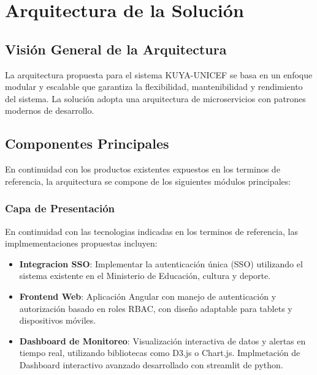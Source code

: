 \section{Arquitectura de la Solución}

\subsection{Visión General de la Arquitectura}

La arquitectura propuesta para el sistema KUYA-UNICEF se basa en un enfoque modular y escalable que garantiza la flexibilidad, mantenibilidad y rendimiento del sistema. La solución adopta una arquitectura de microservicios con patrones modernos de desarrollo.

\subsection{Componentes Principales}
En continuidad con los productos existentes expuestos en los terminos de referencia, la arquitectura se compone de los siguientes módulos principales:

\subsubsection{Capa de Presentación}
En continuidad con las tecnologias indicadas en los terminos de referencia, las implmementaciones propuestas incluyen:
\begin{itemize}
    \item \textbf{Integracion SSO}: Implementar la autenticación única (SSO) utilizando el sistema existente en el Ministerio de Educación, cultura y deporte.
    \item \textbf{Frontend Web}: Aplicación Angular con manejo de autenticación y autorización basado en roles RBAC, con diseño adaptable para tablets y dispositivos móviles.
    \item \textbf{Dashboard de Monitoreo}: Visualización interactiva de datos y alertas en tiempo real, utilizando bibliotecas como D3.js o Chart.js.
    Implmetación de Dashboard interactivo avanzado desarrollado con streamlit de python.
\end{itemize}

